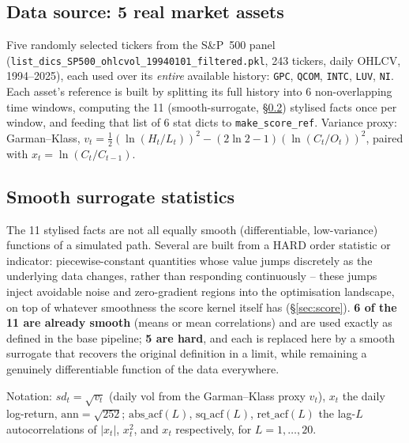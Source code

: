 \documentclass[11pt]{article}
\begin{document}
\subsection{Data source: 5 real market assets}
\label{sec:datasource}
Five randomly selected tickers from the S\&P~500 panel
(\texttt{list\_dics\_SP500\_ohlcvol\_19940101\_filtered.pkl}, 243 tickers, daily OHLCV,
1994--2025), each used over its \emph{entire} available history:
\texttt{GPC}, \texttt{QCOM}, \texttt{INTC}, \texttt{LUV}, \texttt{NI}. Each asset's
reference is built by splitting its full history into 6 non-overlapping time windows,
computing the 11 (smooth-surrogate, \S\ref{sec:smoothstats}) stylised facts once per
window, and feeding that list of 6 stat dicts to \texttt{make\_score\_ref}. Variance
proxy: Garman--Klass, $v_t=\tfrac12(\ln(H_t/L_t))^2-(2\ln2-1)(\ln(C_t/O_t))^2$, paired
with $x_t=\ln(C_t/C_{t-1})$.

\subsection{Smooth surrogate statistics}
\label{sec:smoothstats}
The 11 stylised facts are not all equally smooth (differentiable, low-variance)
functions of a simulated path. Several are built from a HARD order statistic or
indicator: piecewise-constant quantities whose value jumps discretely as the
underlying data changes, rather than responding continuously -- these jumps inject
avoidable noise and zero-gradient regions into the optimisation landscape, on top of
whatever smoothness the score kernel itself has (\S\ref{sec:score}). \textbf{6 of the
11 are already smooth} (means or mean correlations) and are used exactly as defined in
the base pipeline; \textbf{5 are hard}, and each is replaced here by a smooth surrogate
that recovers the original definition in a limit, while remaining a genuinely
differentiable function of the data everywhere.

Notation: $sd_t=\sqrt{v_t}$ (daily vol from the Garman--Klass proxy $v_t$), $x_t$ the
daily log-return, $\text{ann}=\sqrt{252}$; $\text{abs\_acf}(L)$, $\text{sq\_acf}(L)$,
$\text{ret\_acf}(L)$ the lag-$L$ autocorrelations of $|x_t|$, $x_t^2$, and $x_t$
respectively, for $L=1,\dots,20$.
\end{document}
